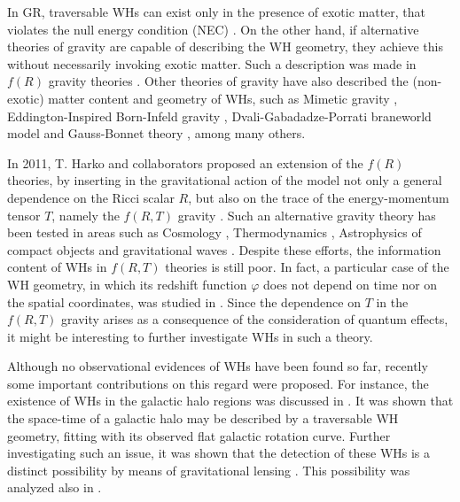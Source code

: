 \documentclass[aps,preprint,onecolumn,11pt,showkeys]{revtex4}%
\begin{document}
In GR, traversable WHs can exist only in the presence of exotic matter, that
violates the null energy condition (NEC) \cite{morris/1988}. On the other
hand, if alternative theories of gravity are capable of describing the WH
geometry, they achieve this without necessarily invoking exotic matter.
Such a description was made in $f(R)$ gravity theories
\cite{pavlovic/2015,lobo/2014,rahaman/2014,harko/2013,de_benedicts/2012,lobo/2009,furey/2005}%
. Other theories of gravity have also described the (non-exotic) matter
content and geometry of WHs, such as Mimetic gravity \cite{myrzakulov/2016},
Eddington-Inspired Born-Infeld gravity
\cite{harko/2015,shaikh/2015,eiroa/2012}, Dvali-Gabadadze-Porrati braneworld
model \cite{richarte/2013} and Gauss-Bonnet theory
\cite{mehdizadeh/2015,kanti/2011,maeda/2008}, among many others.

In 2011, T. Harko and collaborators proposed an extension of the $f(R)$
theories, by inserting in the gravitational action of the model not only a
general dependence on the Ricci scalar $R$, but also on the trace of the
energy-momentum tensor $T$, namely the $f(R,T)$ gravity \cite{harko/2011}.
Such an alternative gravity theory has been tested in areas such as Cosmology
\cite{mrc/2016,mc/2016,cm/2016,ms/2016,moraes/2016,moraes/2015,baffou/2015,shabani/2014,moraes/2014,shabani/2013}%
, Thermodynamics \cite{mmm/2016,harko/2014,sharif/2012,sharif/2012b},
Astrophysics of compact objects
\cite{mam/2016,zubair/2016,shamir/2015,noureen/2015,zubair/2015} and
gravitational waves \cite{amam/2016}. Despite these efforts, the information
content of WHs in $f(R,T)$ theories is still poor. In fact, a particular case
of the WH geometry, in which its redshift function $\varphi$ does not depend
on time nor on the spatial coordinates, was studied in
\cite{azizi/2013,zubair/2016b}. Since the dependence on $T$ in the $f(R,T)$
gravity arises as a consequence of the consideration of quantum effects, it
might be interesting to further investigate WHs in such a theory.

Although no observational evidences of WHs have been found so far, recently
some important contributions on this regard were proposed. For instance, the
existence of WHs in the galactic halo regions was discussed in
\cite{rahaman/2014b}. It was shown that the space-time of a galactic halo may
be described by a traversable WH geometry, fitting with its observed flat
galactic rotation curve. Further investigating such an issue, it was shown
that the detection of these WHs is a distinct possibility by means of
gravitational lensing \cite{kuhfittig/2014}. This possibility was analyzed
also in \cite{nandi/2006}.
\end{document}
